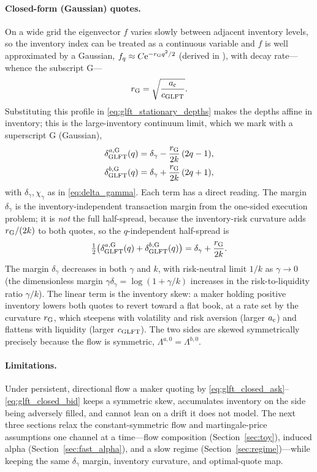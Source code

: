 \documentclass[11pt,a4paper]{article}
\newcommand{\e}{\mathrm e}
\theoremstyle{plain}
\theoremstyle{definition}
\begin{document}
\paragraph{Closed-form (Gaussian) quotes.}
On a wide grid the eigenvector \(f\) varies slowly between adjacent inventory
levels, so the inventory index can be treated as a continuous variable and
\(f\) is well approximated by a Gaussian, \(f_q\approx C\e^{-r_{\rm G}q^2/2}\)
(derived in \cite{GLFT2013}), with decay rate---whence the subscript
\(\mathrm G\)---
\[
r_{\rm G}=\sqrt{\frac{a_{\rm c}}{c_{\rm GLFT}}}.
\]
Substituting this profile in \eqref{eq:glft_stationary_depths} makes the depths
affine in inventory; this is the large-inventory continuum limit, which we mark
with a superscript \(\mathrm G\) (Gaussian),
\begin{align}
\delta_{\rm GLFT}^{a,\mathrm G}(q)
&=
\delta_\gamma-\frac{r_{\rm G}}{2k}\,(2q-1),
\label{eq:glft_closed_ask}\\
\delta_{\rm GLFT}^{b,\mathrm G}(q)
&=
\delta_\gamma+\frac{r_{\rm G}}{2k}\,(2q+1),
\label{eq:glft_closed_bid}
\end{align}
with \(\delta_\gamma,\chi_\gamma\) as in \eqref{eq:delta_gamma}.  Each term has
a direct reading.  The margin \(\delta_\gamma\) is the inventory-independent
transaction margin from the one-sided execution problem; it is \emph{not} the
full half-spread, because the inventory-risk curvature adds \(r_{\rm G}/(2k)\) to
both quotes, so the \(q\)-independent half-spread is
\[
\tfrac12\bigl(\delta_{\rm GLFT}^{a,\mathrm G}(q)+\delta_{\rm GLFT}^{b,\mathrm G}(q)\bigr)
=\delta_\gamma+\frac{r_{\rm G}}{2k}.
\]
The margin \(\delta_\gamma\) decreases in both \(\gamma\) and \(k\), with
risk-neutral limit \(1/k\) as \(\gamma\to0\) (the dimensionless margin
\(\gamma\delta_\gamma=\log(1+\gamma/k)\) increases in the risk-to-liquidity ratio
\(\gamma/k\)).  The linear term is the inventory skew: a maker holding
positive inventory lowers both quotes to revert toward a flat book, at a rate
set by the curvature \(r_{\rm G}\), which steepens with volatility and risk
aversion (larger \(a_{\rm c}\)) and flattens with liquidity (larger
\(c_{\rm GLFT}\)).  The two sides are skewed symmetrically precisely because
the flow is symmetric, \(\Lambda^{a,0}=\Lambda^{b,0}\).

\paragraph{Limitations.}
Under persistent, directional flow a maker quoting by
\eqref{eq:glft_closed_ask}--\eqref{eq:glft_closed_bid} keeps a symmetric skew,
accumulates inventory on the side being adversely filled, and cannot lean on a
drift it does not model.  The next three sections relax the constant-symmetric
flow and martingale-price assumptions one channel at a time---flow composition
(Section~\ref{sec:toy}), induced alpha (Section~\ref{sec:fast_alpha}), and a
slow regime (Section~\ref{sec:regime})---while keeping the same
\(\delta_\gamma\) margin, inventory curvature, and optimal-quote map.
\end{document}
